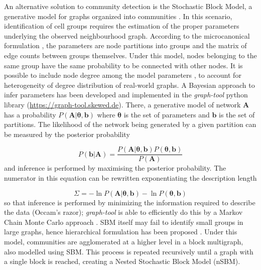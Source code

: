 \documentclass[10pt,letterpaper]{article}
\begin{document}
An alternative solution to community detection is the Stochastic Block Model, a generative model for graphs organized into communities \cite{holland_1983}. In this scenario, identification of cell groups requires the estimation of the proper parameters underlying the observed neighbourhood graph. According to the microcanonical formulation \cite{peixoto_2017}, the parameters are node partitions into groups and the matrix of edge counts between groups themselves. Under this model, nodes belonging to the same group have the same probability to be connected with other nodes. It is possible to include node degree among the model parameters \cite{karrer_2011}, to account for heterogeneity of degree distribution of real-world graphs. A Bayesian approach to infer parameters has been developed \cite{peixoto_2013} and implemented in the \emph{graph-tool} python library (\href{https://graph-tool.skewed.de}{https:/\slash graph-tool.skewed.de}). There, a generative model of network $\boldsymbol A$ has a probability $P(\boldsymbol A|\boldsymbol\theta, \boldsymbol b)$ where \textbf{$\boldsymbol\theta$} is the set of parameters and \textbf{\emph{$\boldsymbol b$}} is the set of partitions. The likelihood of the network being generated by a given partition can be measured by the posterior probability


\begin{equation}
P(\boldsymbol b | \boldsymbol A) = \frac{P(\boldsymbol A|\boldsymbol\theta, \boldsymbol b)P(\boldsymbol\theta, \boldsymbol b)}{P(\boldsymbol A)}
\end{equation}
\label{MPEquationElement:820CB015-E51E-4C5A-BD9C-70E667B8F73B}
and inference is performed by maximising the posterior probability. The numerator in this equation can be rewritten exponentiating the description length


\begin{equation}
\Sigma = -\ln P(\boldsymbol A|\boldsymbol\theta, \boldsymbol b) - \ln P(\boldsymbol\theta, \boldsymbol b)
\end{equation}
\label{MPEquationElement:676396C0-2D6F-4084-89B1-951DE3032087}
so that inference is performed by minimizing the information required to describe the data (Occam's razor); \emph{graph-tool} is able to efficiently do this by a Markov Chain Monte Carlo approach \cite{peixoto_2014}. SBM itself may fail to identify small groups in large graphs, hence hierarchical formulation has been proposed \cite{peixoto_2014_h}. Under this model, communities are agglomerated at a higher level in a block multigraph, also modelled using SBM. This process is repeated recursively until a graph with a single block is reached, creating a Nested Stochastic Block Model (nSBM).
\end{document}
